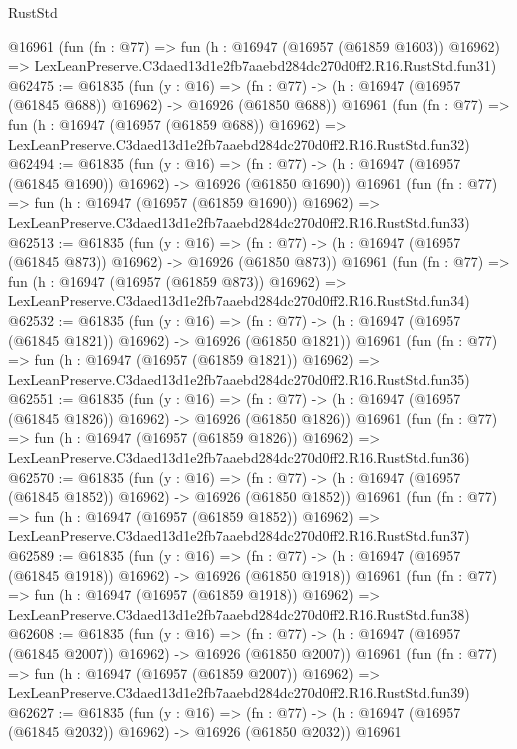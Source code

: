 \begin{lexlean}{RustStd}
\begin{coremodule}
    @16961
    (fun (fn : @77) =>
    fun (h : @16947 (@16957 (@61859 @1603)) @16962) =>
    LexLeanPreserve.C3daed13d1e2fb7aaebd284dc270d0ff2.R16.RustStd.fun31)
@62475 := @61835
    (fun (y : @16) =>
    (fn : @77) -> (h : @16947 (@16957 (@61845 @688)) @16962) -> @16926 (@61850 @688))
    @16961
    (fun (fn : @77) =>
    fun (h : @16947 (@16957 (@61859 @688)) @16962) =>
    LexLeanPreserve.C3daed13d1e2fb7aaebd284dc270d0ff2.R16.RustStd.fun32)
@62494 := @61835
    (fun (y : @16) =>
    (fn : @77) -> (h : @16947 (@16957 (@61845 @1690)) @16962) -> @16926 (@61850 @1690))
    @16961
    (fun (fn : @77) =>
    fun (h : @16947 (@16957 (@61859 @1690)) @16962) =>
    LexLeanPreserve.C3daed13d1e2fb7aaebd284dc270d0ff2.R16.RustStd.fun33)
@62513 := @61835
    (fun (y : @16) =>
    (fn : @77) -> (h : @16947 (@16957 (@61845 @873)) @16962) -> @16926 (@61850 @873))
    @16961
    (fun (fn : @77) =>
    fun (h : @16947 (@16957 (@61859 @873)) @16962) =>
    LexLeanPreserve.C3daed13d1e2fb7aaebd284dc270d0ff2.R16.RustStd.fun34)
@62532 := @61835
    (fun (y : @16) =>
    (fn : @77) -> (h : @16947 (@16957 (@61845 @1821)) @16962) -> @16926 (@61850 @1821))
    @16961
    (fun (fn : @77) =>
    fun (h : @16947 (@16957 (@61859 @1821)) @16962) =>
    LexLeanPreserve.C3daed13d1e2fb7aaebd284dc270d0ff2.R16.RustStd.fun35)
@62551 := @61835
    (fun (y : @16) =>
    (fn : @77) -> (h : @16947 (@16957 (@61845 @1826)) @16962) -> @16926 (@61850 @1826))
    @16961
    (fun (fn : @77) =>
    fun (h : @16947 (@16957 (@61859 @1826)) @16962) =>
    LexLeanPreserve.C3daed13d1e2fb7aaebd284dc270d0ff2.R16.RustStd.fun36)
@62570 := @61835
    (fun (y : @16) =>
    (fn : @77) -> (h : @16947 (@16957 (@61845 @1852)) @16962) -> @16926 (@61850 @1852))
    @16961
    (fun (fn : @77) =>
    fun (h : @16947 (@16957 (@61859 @1852)) @16962) =>
    LexLeanPreserve.C3daed13d1e2fb7aaebd284dc270d0ff2.R16.RustStd.fun37)
@62589 := @61835
    (fun (y : @16) =>
    (fn : @77) -> (h : @16947 (@16957 (@61845 @1918)) @16962) -> @16926 (@61850 @1918))
    @16961
    (fun (fn : @77) =>
    fun (h : @16947 (@16957 (@61859 @1918)) @16962) =>
    LexLeanPreserve.C3daed13d1e2fb7aaebd284dc270d0ff2.R16.RustStd.fun38)
@62608 := @61835
    (fun (y : @16) =>
    (fn : @77) -> (h : @16947 (@16957 (@61845 @2007)) @16962) -> @16926 (@61850 @2007))
    @16961
    (fun (fn : @77) =>
    fun (h : @16947 (@16957 (@61859 @2007)) @16962) =>
    LexLeanPreserve.C3daed13d1e2fb7aaebd284dc270d0ff2.R16.RustStd.fun39)
@62627 := @61835
    (fun (y : @16) =>
    (fn : @77) -> (h : @16947 (@16957 (@61845 @2032)) @16962) -> @16926 (@61850 @2032))
    @16961

\end{coremodule}
\end{lexlean}
